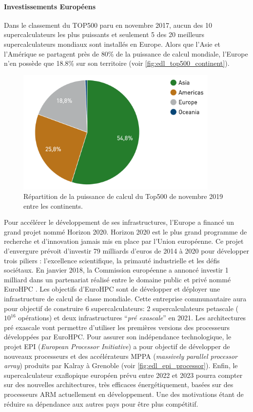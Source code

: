     \paragraph{Investissements Européens} Dans le classement du TOP500 paru en novembre 2017, aucun des 10 supercalculateurs les plus puissants et seulement 5 des 20 meilleurs supercalculateurs mondiaux sont installés en Europe. Alors que l'Asie et l'Amérique se partagent près de 80\% de la puissance de calcul mondiale, l’Europe n'en possède que  18.8\% sur son territoire (voir \autoref{fig:edl_top500_continent}).
    
    \begin{figure}
        \center
        \includegraphics[width=10cm]{images/edl_top500_continent.png}
        \caption{\label{fig:edl_top500_continent} Répartition de la puissance de calcul du Top500 de novembre 2019 entre les continents.}
    \end{figure}
    
    
    Pour accélérer le développement de ses infrastructures, l’Europe a financé un grand projet nommé Horizon 2020. Horizon 2020 est le plus grand programme de recherche et d'innovation jamais mis en place par l'Union européenne. Ce projet d’envergure prévoit d’investir 79 milliards d’euros de 2014 à 2020 pour développer trois piliers : l'excellence scientifique, la primauté industrielle et les défis sociétaux.
    En janvier 2018, la Commission européenne a annoncé investir 1 milliard dans un partenariat réalisé entre le domaine public et privé nommé EuroHPC \cite{EuroHPC2018}. Les objectifs d'EuroHPC sont de développer et déployer une infrastructure de calcul de classe mondiale. 
    Cette entreprise communautaire aura pour objectif de construire 6 supercalculateurs: 2 supercalculateurs petascale ($10^{16}$ opérations) et deux infrastructures ``\textit{pré exascale}'' en 2021. Les architectures pré exascale vont permettre d'utiliser les premières versions des processeurs développées par EuroHPC. Pour assurer son indépendance technologique, le projet EPI (\textit{European Processor Initiative}) a pour objectif de développer de nouveaux processeurs et des accélérateurs MPPA (\textit{massively parallel processor array}) produits par Kalray à Grenoble (voir \autoref{fig:edl_epi_processor}). Enfin, le supercalculateur exaflopique européen prévu entre 2022 et 2023 pourra compter sur des nouvelles architectures, très efficaces énergétiquement, basées sur des processeurs ARM actuellement en développement. Une des motivations étant de réduire sa dépendance aux autres pays pour être plus compétitif.  

